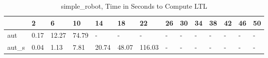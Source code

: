 \begin{table}
\caption{simple_robot, Time in Seconds to Compute LTL}
\label{simple_robot_LTL_time}
\begin{tabular}{llllllllllllll}
\toprule
 & 2 & 6 & 10 & 14 & 18 & 22 & 26 & 30 & 34 & 38 & 42 & 46 & 50 \\
\midrule
aut & 0.17 & 12.27 & 74.79 & - & - & - & - & - & - & - & - & - & - \\
aut_s & 0.04 & 1.13 & 7.81 & 20.74 & 48.07 & 116.03 & - & - & - & - & - & - & - \\
\bottomrule
\end{tabular}
\end{table}
